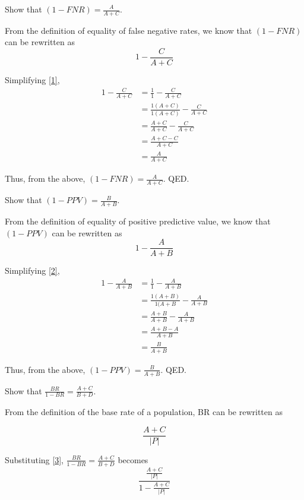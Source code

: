 \documentclass{cisXXX} %
\begin{document}
\maketitle
\HWproblem
Show that $(1-FNR) = \frac{A}{A+C}$.

From the definition of equality of false negative rates, we know that $(1-FNR)$ can be rewritten as 
\begin{equation}
\label{1} 1-\frac{C}{A+C}
\end{equation}

Simplifying \eqref{1},
\begin{align*}
1-\frac{C}{A+C} &= \frac{1}{1} - \frac{C}{A+C}\\
&=\frac{1(A+C)}{1(A+C)} - \frac{C}{A+C}\\
&=\frac{A+C}{A+C} - \frac{C}{A+C}\\
&=\frac{A+C-C}{A+C}\\
&=\frac{A}{A+C}
\end{align*}

Thus, from the above, $(1-FNR) = \frac{A}{A+C}$. QED.

\HWproblem
Show that $(1-PPV) = \frac{B}{A+B}$.

From the definition of equality of positive predictive value, we know that $(1-PPV)$ can be rewritten as
\begin{equation}
\label{2} 1-\frac{A}{A+B}
\end{equation}

Simplifying \eqref{2},
\begin{align*}
1-\frac{A}{A+B} &= \frac{1}{1} - \frac{A}{A+B}\\
&= \frac{1(A+B)}{1(A+B} - \frac{A}{A+B}\\
&= \frac{A+B}{A+B} - \frac{A}{A+B}\\
&= \frac{A+B - A}{A+B}\\
&= \frac{B}{A+B}
\end{align*}

Thus, from the above, $(1-PPV) = \frac{B}{A+B}$. QED.

\HWproblem
Show that $\frac{BR}{1-BR} = \frac{A+C}{B+D}$.

From the definition of the base rate of a population, BR can be rewritten as

\begin{equation}
\label{3} \frac{A+C}{|P|}
\end{equation}

Substituting \eqref{3}, $\frac{BR}{1-BR} = \frac{A+C}{B+D}$ becomes
\begin{equation}
\label{4} \frac{\frac{A+C}{|P|}}{1-\frac{A+C}{|P|}}
\end{equation}
\end{document}
